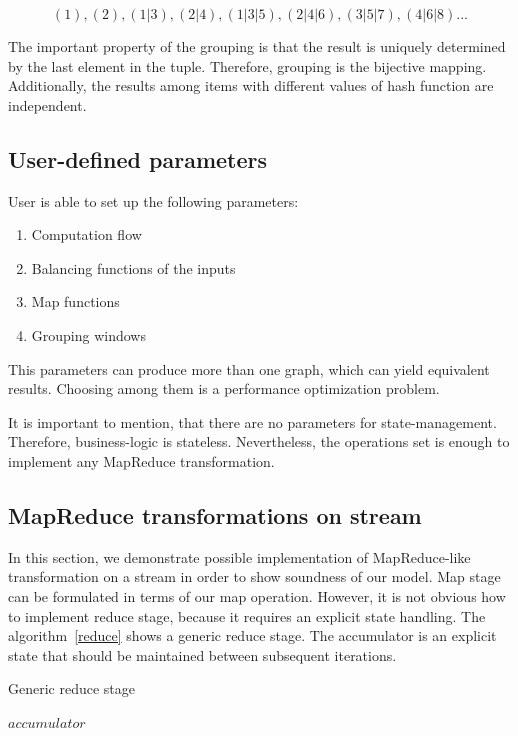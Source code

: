 \[(1), (2), (1|3), (2|4), (1|3|5), (2|4|6), (3|5|7), (4|6|8)...\]

The important property of the grouping is that the result is uniquely determined by the last element in the tuple. Therefore, grouping is the bijective mapping. Additionally, the results among items with different values of hash function are independent.

\subsection{User-defined parameters}

User is able to set up the following parameters:

\begin{enumerate}
  \item{Computation flow}
  \item{Balancing functions of the inputs}
  \item{Map functions}
  \item{Grouping windows}
\end{enumerate}

This parameters can produce more than one graph, which can yield equivalent results. Choosing among them is a performance optimization problem.    

It is important to mention, that there are no parameters for state-management. Therefore, business-logic is stateless. Nevertheless, the operations set is enough to implement any MapReduce transformation.

\subsection{MapReduce transformations on stream}

In this section, we demonstrate possible implementation of MapReduce-like transformation on a stream in order to show soundness of our model. Map stage can be formulated in terms of our map operation. However, it is not obvious how to implement reduce stage, because it requires an explicit state handling. The algorithm~\ref{reduce} shows a generic reduce stage. The accumulator is an explicit state that should be maintained between subsequent iterations.

\begin{algorithm}
\caption{Generic reduce stage}
\label{reduce}
\begin{algorithmic}
    \State $accumulator$ 
      \State {}
    \EndFor
    \State {}
  \EndFunction
\end{algorithmic}
\end{algorithm}

